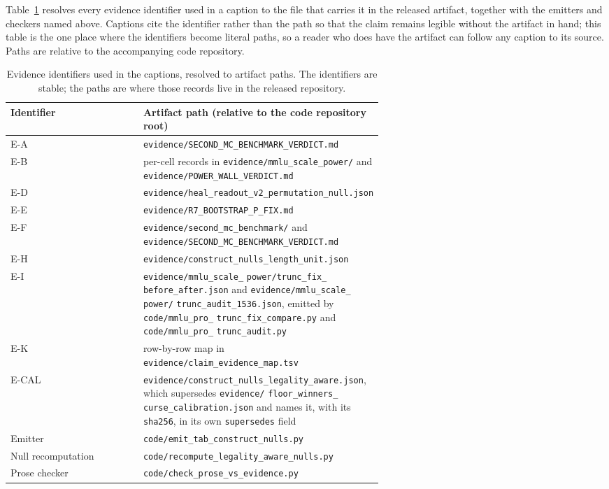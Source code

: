 Table~\ref{tab:artifact-map} resolves every evidence identifier used in a caption to the
file that carries it in the released artifact, together with the emitters and checkers named
above. Captions cite the identifier rather than the path so that the claim remains legible
without the artifact in hand; this table is the one place where the identifiers become
literal paths, so a reader who does have the artifact can follow any caption to its source.
Paths are relative to the accompanying code repository.

\begin{table}[!htbp]
\centering
\small
\setlength{\tabcolsep}{4pt}
\begin{tabular}{lp{0.62\linewidth}}
\toprule
Identifier & Artifact path (relative to the code repository root) \\
\midrule
\textsf{E-A} & \texttt{evidence/SECOND\_MC\_BENCHMARK\_VERDICT.md} \\
\textsf{E-B} & per-cell records in \texttt{evidence/mmlu\_scale\_power/} and \texttt{evidence/POWER\_WALL\_VERDICT.md} \\
\textsf{E-D} & \texttt{evidence/heal\_readout\_v2\_permutation\_null.json} \\
\textsf{E-E} & \texttt{evidence/R7\_BOOTSTRAP\_P\_FIX.md} \\
\textsf{E-F} & \texttt{evidence/second\_mc\_benchmark/} and \texttt{evidence/SECOND\_MC\_BENCHMARK\_VERDICT.md} \\
\textsf{E-H} & \texttt{evidence/construct\_nulls\_length\_unit.json} \\
\textsf{E-I} & \texttt{evidence/mmlu\_scale\_} \texttt{power/trunc\_fix\_} \texttt{before\_after.json} and \texttt{evidence/mmlu\_scale\_} \texttt{power/} \texttt{trunc\_audit\_1536.json}, emitted by \texttt{code/mmlu\_pro\_} \texttt{trunc\_fix\_compare.py} and \texttt{code/mmlu\_pro\_} \texttt{trunc\_audit.py} \\
\textsf{E-K} & row-by-row map in \texttt{evidence/claim\_evidence\_map.tsv} \\
\textsf{E-CAL} & \texttt{evidence/construct\_nulls\_legality\_aware.json}, which supersedes \texttt{evidence/} \texttt{floor\_winners\_} \texttt{curse\_calibration.json} and names it, with its \texttt{sha256}, in its own \texttt{supersedes} field \\
Emitter & \texttt{code/emit\_tab\_construct\_nulls.py} \\
Null recomputation & \texttt{code/recompute\_legality\_aware\_nulls.py} \\
Prose checker & \texttt{code/check\_prose\_vs\_evidence.py} \\
\bottomrule
\end{tabular}
\caption{Evidence identifiers used in the captions, resolved to artifact paths. The identifiers are stable; the paths are where those records live in the released repository.}
\label{tab:artifact-map}
\end{table}
